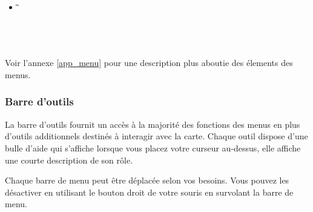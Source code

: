 \begin{itemize}
\item {}
\begin{tabbing}
\hspace{4.5cm}\=\hspace{3cm}\=\hspace{3.5cm}\= \kill
{}
 \> 
 \>            
 \> \\
 \> 
 \>           
 \\
 \\
 \\
\end{tabbing}

\end{itemize}

Voir l'annexe \ref{app_menu} pour une description plus aboutie des \'elements des menus.

\subsubsection{Barre d'outils}\label{label_toolbars}

%

La barre d'outils fournit un acc\`es \`a la majorit\'e des fonctions des menus en plus d'outils additionnels destin\'es \`a interagir avec la carte. Chaque outil dispose d'une bulle d'aide qui s'affiche lorsque vous placez votre curseur au-dessus, elle affiche une courte description de son r\^ole.

Chaque barre de menu peut \^etre d\'eplac\'ee selon vos besoins. Vous pouvez les d\'esactiver en utilisant le bouton droit de votre souris en survolant la barre de menu.

